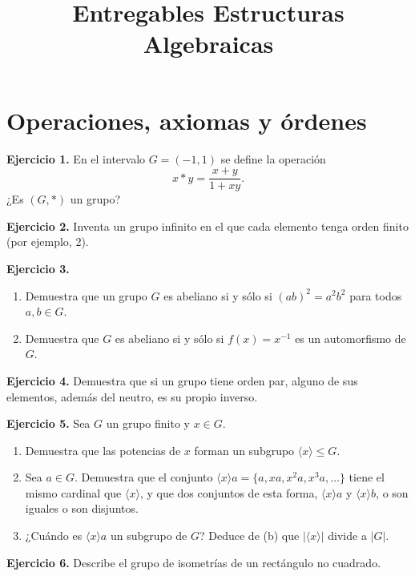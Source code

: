 \documentclass[11pt,a4paper]{article}
\title{Entregables Estructuras Algebraicas}
\author{}
\date{}
\newcommand{\ej}[1]{\par\medskip\textbf{Ejercicio #1.}\enspace}
\begin{document}
\maketitle
\section{Operaciones, axiomas y órdenes}
\ej{1} En el intervalo $G=(-1,1)$ se define la operación
\[x*y=\frac{x+y}{1+xy}.\]
¿Es $(G,*)$ un grupo?
\ej{2} Inventa un grupo infinito en el que cada elemento tenga orden finito (por ejemplo, 2).
\ej{3}
\begin{enumerate}[label=(\alph*)]
\item Demuestra que un grupo $G$ es abeliano si y sólo si $(ab)^2=a^2b^2$ para todos $a,b\in G$.
\item Demuestra que $G$ es abeliano si y sólo si $f(x)=x^{-1}$ es un automorfismo de $G$.
\end{enumerate}
\ej{4} Demuestra que si un grupo tiene orden par, alguno de sus elementos, además del neutro, es su propio inverso.
\ej{5} Sea $G$ un grupo finito y $x\in G$.
\begin{enumerate}[label=(\alph*)]
\item Demuestra que las potencias de $x$ forman un subgrupo $\langle x\rangle\leq G$.
\item Sea $a\in G$. Demuestra que el conjunto $\langle x\rangle a=\{a,xa,x^2a,x^3a,\ldots\}$ tiene el mismo cardinal que $\langle x\rangle$, y que dos conjuntos de esta forma, $\langle x\rangle a$ y $\langle x\rangle b$, o son iguales o son disjuntos.
\item ¿Cuándo es $\langle x\rangle a$ un subgrupo de $G$? Deduce de (b) que $|\langle x\rangle|$ divide a $|G|$.
\end{enumerate}
\ej{6} Describe el grupo de isometrías de un rectángulo no cuadrado.
\end{document}
